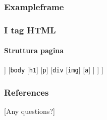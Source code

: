 \begin{exerciseframe}
    \frametitle{Exampleframe}
\end{exerciseframe}


\begin{contentframe}
    \frametitle{I tag HTML}
    \framesubtitle{Struttura pagina}

    \centering
    \smartarttree
        [\texttt{html}
            [\texttt{head}
            [\texttt{title}]
                [\texttt{meta charset}]
                [\texttt{meta author}]
            ]
            [\texttt{body}
                [\texttt{h1}]
                [\texttt{p}]
                [\texttt{div}
                    [\texttt{img}]
                    [\texttt{a}]
                ]
            ]
        ]
        
\end{contentframe}

\begin{bibframe}
    \frametitle{References}
\end{bibframe}

[Any questions?]